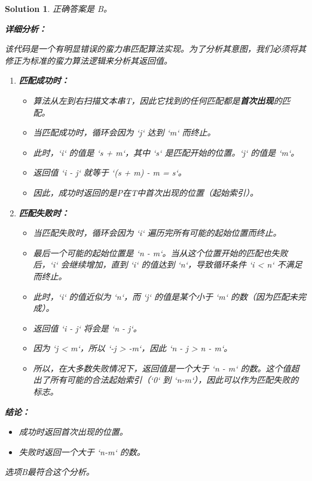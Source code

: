 \documentclass[UTF8]{report}
\newtheorem{solution}{Solution}
\theoremstyle{MyLineTheoremStyle} %
\theoremstyle{MyBlockTheoremStyle} %
\theoremstyle{MySubsubsectionStyle} %
\begin{document}
\begin{solution}
正确答案是 B。

\textbf{详细分析：}

该代码是一个有明显错误的蛮力串匹配算法实现。为了分析其意图，我们必须将其修正为标准的蛮力算法逻辑来分析其返回值。

\begin{enumerate}
    \item \textbf{匹配成功时：}
    \begin{itemize}
        \item 算法从左到右扫描文本串T，因此它找到的任何匹配都是\textbf{首次出现}的匹配。
        \item 当匹配成功时，循环会因为 `j` 达到 `m` 而终止。
        \item 此时，`i` 的值是 `s + m`，其中 `s` 是匹配开始的位置。`j` 的值是 `m`。
        \item 返回值 `i - j` 就等于 `(s + m) - m = s`。
        \item 因此，成功时返回的是P在T中首次出现的位置（起始索引）。
    \end{itemize}

    \item \textbf{匹配失败时：}
    \begin{itemize}
        \item 当匹配失败时，循环会因为 `i` 遍历完所有可能的起始位置而终止。
        \item 最后一个可能的起始位置是 `n - m`。当从这个位置开始的匹配也失败后，`i` 会继续增加，直到 `i` 的值达到 `n`，导致循环条件 `i < n` 不满足而终止。
        \item 此时，`i` 的值近似为 `n`，而 `j` 的值是某个小于 `m` 的数（因为匹配未完成）。
        \item 返回值 `i - j` 将会是 `n - j`。
        \item 因为 `j < m`，所以 `-j > -m`，因此 `n - j > n - m`。
        \item 所以，在大多数失败情况下，返回值是一个大于 `n - m` 的数。这个值超出了所有可能的合法起始索引（`0` 到 `n-m`），因此可以作为匹配失败的标志。
    \end{itemize}
\end{enumerate}

\textbf{结论：}
\begin{itemize}
    \item 成功时返回首次出现的位置。
    \item 失败时返回一个大于 `n-m` 的数。
\end{itemize}
选项B最符合这个分析。
\end{solution}
\end{document}
